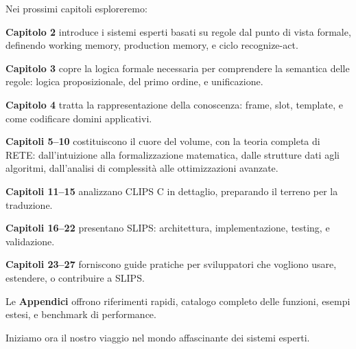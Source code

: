 Nei prossimi capitoli esploreremo:

\textbf{Capitolo 2} introduce i sistemi esperti basati su regole dal punto di vista formale, definendo working memory, production memory, e ciclo recognize-act.

\textbf{Capitolo 3} copre la logica formale necessaria per comprendere la semantica delle regole: logica proposizionale, del primo ordine, e unificazione.

\textbf{Capitolo 4} tratta la rappresentazione della conoscenza: frame, slot, template, e come codificare domini applicativi.

\textbf{Capitoli 5--10} costituiscono il cuore del volume, con la teoria completa di RETE: dall'intuizione alla formalizzazione matematica, dalle strutture dati agli algoritmi, dall'analisi di complessità alle ottimizzazioni avanzate.

\textbf{Capitoli 11--15} analizzano CLIPS C in dettaglio, preparando il terreno per la traduzione.

\textbf{Capitoli 16--22} presentano SLIPS: architettura, implementazione, testing, e validazione.

\textbf{Capitoli 23--27} forniscono guide pratiche per sviluppatori che vogliono usare, estendere, o contribuire a SLIPS.

Le \textbf{Appendici} offrono riferimenti rapidi, catalogo completo delle funzioni, esempi estesi, e benchmark di performance.

\vspace{1cm}

Iniziamo ora il nostro viaggio nel mondo affascinante dei sistemi esperti.

